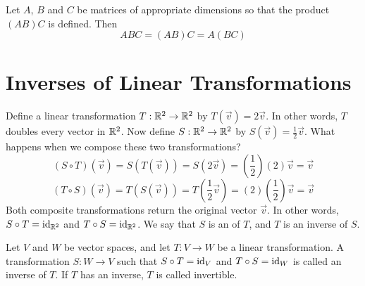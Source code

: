 \documentclass{ximera}
\begin{document}
\begin{theorem} \label{th:associativematrixmult}  Let $A$, $B$ and $C$ be matrices of appropriate dimensions so that the product $(AB)C$ is defined.  Then
$$ABC=(AB)C=A(BC)$$
\end{theorem}

\section*{Inverses of Linear Transformations}

\begin{initprob}\label{ep:inverse} Define a linear transformation $T:\mathbb{R}^2\rightarrow \mathbb{R}^2$ by $T(\vec{v})=2\vec{v}$.  In other words, $T$ doubles every vector in $\mathbb{R}^2$.  Now define $S:\mathbb{R}^2\rightarrow \mathbb{R}^2$ by $S(\vec{v})=\frac{1}{2}\vec{v}$.  What happens when we compose these two transformations?
$$(S\circ T)(\vec{v})=S(T(\vec{v}))=S(2\vec{v})=\left(\frac{1}{2}\right)(2)\vec{v}=\vec{v}$$
$$(T\circ S)(\vec{v})=T(S(\vec{v}))=T(\frac{1}{2}\vec{v})=(2)\left(\frac{1}{2}\right)\vec{v}=\vec{v}$$
Both composite transformations return the original vector $\vec{v}$.  In other words, $S\circ T=\text{id}_{\mathbb{R}^2}$ and $T\circ S=\text{id}_{\mathbb{R}^2}$.  We say that $S$ is an  of $T$, and $T$ is an inverse of $S$.
\end{initprob}

\begin{definition}\label{def:inverse} Let $V$ and $W$ be vector spaces, and let $T:V\rightarrow W$ be a linear transformation.  A transformation $S:W\rightarrow V$ such that $S\circ T=\text{id}_V$ and $T\circ S=\text{id}_W$ is called an inverse of $T$. If $T$ has an inverse, $T$ is called invertible.
\end{definition}
\end{document}
